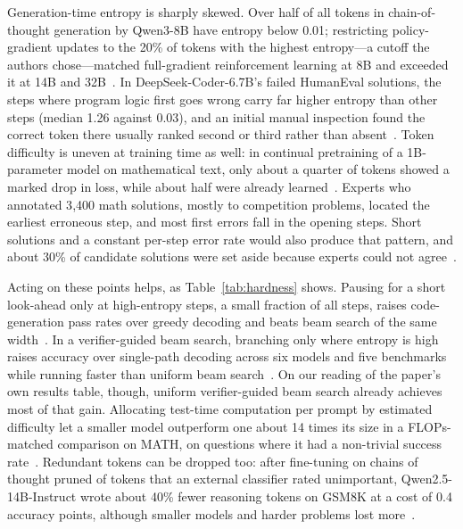 \documentclass{ieeeaccess}
\begin{document}
Generation-time entropy is sharply skewed. Over half of all tokens in chain-of-thought generation by Qwen3-8B have entropy below 0.01; restricting policy-gradient updates to the 20\% of tokens with the highest entropy---a cutoff the authors chose---matched full-gradient reinforcement learning at 8B and exceeded it at 14B and 32B~\cite{wang2025beyond8020}. In DeepSeek-Coder-6.7B's failed HumanEval solutions, the steps where program logic first goes wrong carry far higher entropy than other steps (median 1.26 against 0.03), and an initial manual inspection found the correct token there usually ranked second or third rather than absent~\cite{he2025adadec}. Token difficulty is uneven at training time as well: in continual pretraining of a 1B-parameter model on mathematical text, only about a quarter of tokens showed a marked drop in loss, while about half were already learned~\cite{lin2024rho1}. Experts who annotated 3{,}400 math solutions, mostly to competition problems, located the earliest erroneous step, and most first errors fall in the opening steps. Short solutions and a constant per-step error rate would also produce that pattern, and about 30\% of candidate solutions were set aside because experts could not agree~\cite{zheng2025processbench}.

Acting on these points helps, as Table~\ref{tab:hardness} shows. Pausing for a short look-ahead only at high-entropy steps, a small fraction of all steps, raises code-generation pass rates over greedy decoding and beats beam search of the same width~\cite{he2025adadec}. In a verifier-guided beam search, branching only where entropy is high raises accuracy over single-path decoding across six models and five benchmarks while running faster than uniform beam search~\cite{li2025egb}. On our reading of the paper's own results table, though, uniform verifier-guided beam search already achieves most of that gain. Allocating test-time computation per prompt by estimated difficulty let a smaller model outperform one about 14 times its size in a FLOPs-matched comparison on MATH, on questions where it had a non-trivial success rate~\cite{snell2024scaling}. Redundant tokens can be dropped too: after fine-tuning on chains of thought pruned of tokens that an external classifier rated unimportant, Qwen2.5-14B-Instruct wrote about 40\% fewer reasoning tokens on GSM8K at a cost of 0.4 accuracy points, although smaller models and harder problems lost more~\cite{xia2025tokenskip}.
\end{document}

